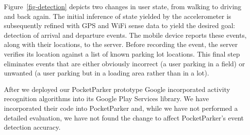 Figure~\ref{fig-detection} depicts two changes in user state, from walking to
driving and back again.  The initial inference of state yielded by the
accelerometer is subsequently refined with GPS and WiFi sense data to yield
the desired goal:  detection of arrival and departure events.  The mobile
device reports these events, along with their locations, to the server.
Before recording the event, the server verifies its location against a list
of known parking lot locations.  This final step eliminates events that are
either obviously incorrect (a user parking in a field) or unwanted (a user
parking but in a loading area rather than in a lot).

After we deployed our PocketParker prototype Google incorporated activity
recognition algorithms into its Google Play Services library. We have
incorporated their code into PocketParker and, while we have not performed a
detailed evaluation, we have not found the change to affect PocketParker's
event detection accuracy.
